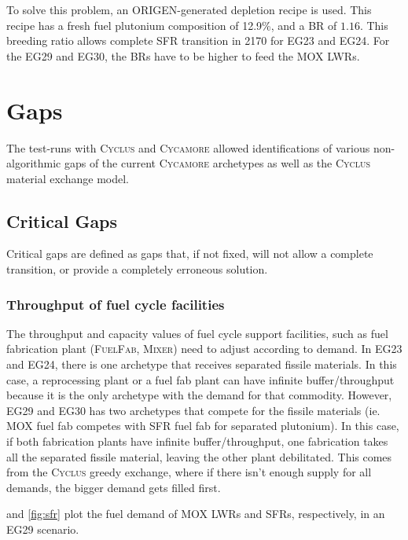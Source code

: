 \documentclass{article}
\newcommand{\Cyclus}{\textsc{Cyclus}\xspace}%
\newcommand{\Cycamore}{\textsc{Cycamore}\xspace}%
\begin{document}
To solve this problem, an ORIGEN-generated depletion recipe is used. This recipe
has a fresh fuel plutonium composition of 12.9\%, and a BR of $1.16$. This breeding
ratio allows complete SFR transition in 2170 for EG23 and EG24. For the EG29 and EG30,
the BRs have to be higher to feed the \gls{MOX} \glspl{LWR}. 


\section{Gaps}
The test-runs with \Cyclus and \Cycamore allowed identifications of various non-algorithmic gaps
of the current \Cycamore archetypes as well as the \Cyclus material exchange model.

\subsection{Critical Gaps}
Critical gaps are defined as gaps that, if not fixed, will not allow a complete transition,
or provide a completely erroneous solution.

\subsubsection{Throughput of fuel cycle facilities}
The throughput and capacity values of fuel cycle support facilities, such as fuel fabrication plant
(\textsc{FuelFab}\xspace, \textsc{Mixer}\xspace) need to adjust according to demand. In EG23 and EG24,
there is one archetype that receives separated fissile materials. In this case, a reprocessing
plant or a fuel fab plant can have infinite buffer/throughput because it is the only
archetype with the demand for that commodity. However, EG29 and EG30 has two archetypes
that compete for the fissile materials (ie. \gls{MOX} fuel fab competes with \gls{SFR} fuel fab for separated plutonium).
In this case, if both fabrication plants have infinite buffer/throughput, one fabrication takes all the
separated fissile material, leaving the other plant debilitated. This comes from the \Cyclus greedy exchange,
where if there isn't enough supply for all demands, the bigger demand gets filled first. 


 and \cref{fig:sfr} plot the fuel demand of \gls{MOX} \glspl{LWR} and \glspl{SFR},
respectively, in an EG29 scenario.
\end{document}
